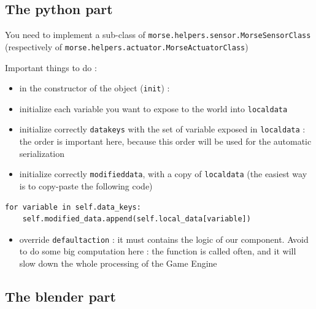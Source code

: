 \documentclass[twoside,a4paper,10pt]{report}
\newcommand{\dokutitleleveltree}[1]{\subsection{#1}}
\newcommand{\dokumonospace}[1]{\texttt{#1}}
\newcommand{\dokuitem}{\item}
\begin{document}
\dokutitleleveltree{The python part}
\label{2f9b01df4a2ece7b3e7028707b901d5f}%

You need to implement a sub-class of \dokumonospace{morse.helpers.sensor.MorseSensorClass} (respectively of \dokumonospace{morse.helpers.actuator.MorseActuatorClass})

Important things to do :


\begin{itemize}
\dokuitem  in the constructor of the object (\dokumonospace{{\textunderscore}{\textunderscore}init{\textunderscore}{\textunderscore}}) :
\dokuitem  initialize each variable you want to expose to the world into \dokumonospace{local{\textunderscore}data}
\dokuitem  initialize correctly \dokumonospace{data{\textunderscore}keys} with the set of variable exposed in \dokumonospace{local{\textunderscore}data} : the order is important here, because this order will be used for the automatic serialization
\dokuitem  initialize correctly \dokumonospace{modified{\textunderscore}data}, with a copy of \dokumonospace{local{\textunderscore}data} (the easiest way is to copy-paste the following code)
\end{itemize}

\lstset{language=python}
\begin{lstlisting}
for variable in self.data_keys:
	self.modified_data.append(self.local_data[variable])

\end{lstlisting}

\begin{itemize}
\dokuitem  override \dokumonospace{default{\textunderscore}action} : it must contains the logic of our component. Avoid to do some big computation here : the function is called often, and it will slow down the whole processing of the Game Engine
\end{itemize}

\dokutitleleveltree{The blender part}
\label{c3a87dbfd0ec95fd40fcfbb5cbd7f50f}%
\end{document}
